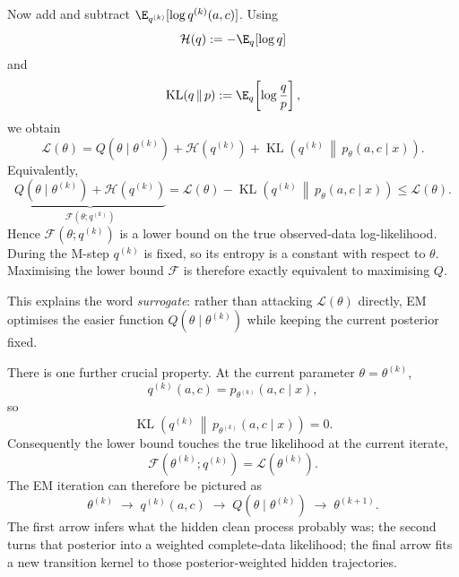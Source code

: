 Now add and subtract
$\E_{q^{(k)}}[\log q^{(k)}(a,c)]$. Using
\begin{equation}
  \mathcal H(q)
  :=
  -\E_q[\log q]
\end{equation}
and
\begin{equation}
  \operatorname{KL}(q\,\|\,p)
  :=
  \E_q\!\left[
    \log\frac{q}{p}
  \right],
\end{equation}
we obtain
\begin{equation}
  \boxed{
  \mathcal L(\theta)
  =
  Q(\theta\mid\theta^{(k)})
  +
  \mathcal H(q^{(k)})
  +
  \operatorname{KL}\!\left(
    q^{(k)}
    \,\middle\|\,
    p_\theta(a,c\mid x)
  \right).
  }
  \label{eq:em-decomposition}
\end{equation}
Equivalently,
\begin{equation}
  \underbrace{
    Q(\theta\mid\theta^{(k)})
    +
    \mathcal H(q^{(k)})
  }_{\displaystyle \mathcal F(\theta;q^{(k)})}
  =
  \mathcal L(\theta)
  -
  \operatorname{KL}\!\left(
    q^{(k)}
    \,\middle\|\,
    p_\theta(a,c\mid x)
  \right)
  \leq
  \mathcal L(\theta).
  \label{eq:em-lower-bound}
\end{equation}
Hence
$\mathcal F(\theta;q^{(k)})$ is a lower bound on the true observed-data
log-likelihood. During the M-step $q^{(k)}$ is fixed, so its entropy is a
constant with respect to $\theta$. Maximising the lower bound
$\mathcal F$ is therefore exactly equivalent to maximising $Q$.

This explains the word \emph{surrogate}: rather than attacking
$\mathcal L(\theta)$ directly, EM optimises the easier function
$Q(\theta\mid\theta^{(k)})$ while keeping the current posterior fixed.

There is one further crucial property. At the current parameter
$\theta=\theta^{(k)}$,
\begin{equation}
  q^{(k)}(a,c)
  =
  p_{\theta^{(k)}}(a,c\mid x),
\end{equation}
so
\begin{equation}
  \operatorname{KL}\!\left(
    q^{(k)}
    \,\middle\|\,
    p_{\theta^{(k)}}(a,c\mid x)
  \right)
  =0.
\end{equation}
Consequently the lower bound touches the true likelihood at the current
iterate,
\begin{equation}
  \mathcal F(\theta^{(k)};q^{(k)})
  =
  \mathcal L(\theta^{(k)}).
  \label{eq:em-touching}
\end{equation}
The EM iteration can therefore be pictured as
\[
  \theta^{(k)}
  \;\longrightarrow\;
  q^{(k)}(a,c)
  \;\longrightarrow\;
  Q(\theta\mid\theta^{(k)})
  \;\longrightarrow\;
  \theta^{(k+1)}.
\]
The first arrow infers what the hidden clean process probably was; the second
turns that posterior into a weighted complete-data likelihood; the final arrow
fits a new transition kernel to those posterior-weighted hidden trajectories.

